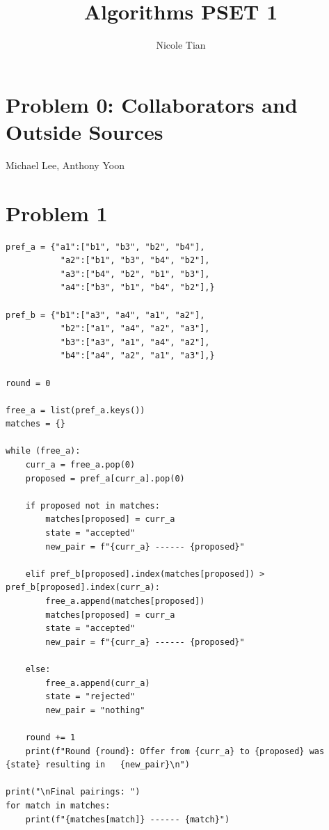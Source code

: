 \documentclass[12pt]{article}
\title{Algorithms PSET 1}
\author{Nicole Tian}
\begin{document}
\maketitle                  %

\section*{Problem 0: Collaborators and Outside Sources}
Michael Lee, Anthony Yoon


\section*{Problem 1}
\begin{algorithm}[H]
\caption{Gale--Shapley (A-proposing) -- Python implementation}
\begin{lstlisting}
pref_a = {"a1":["b1", "b3", "b2", "b4"],
           "a2":["b1", "b3", "b4", "b2"],
           "a3":["b4", "b2", "b1", "b3"],
           "a4":["b3", "b1", "b4", "b2"],}

pref_b = {"b1":["a3", "a4", "a1", "a2"],
           "b2":["a1", "a4", "a2", "a3"],
           "b3":["a3", "a1", "a4", "a2"],
           "b4":["a4", "a2", "a1", "a3"],}

round = 0

free_a = list(pref_a.keys())
matches = {}

while (free_a):
    curr_a = free_a.pop(0)
    proposed = pref_a[curr_a].pop(0)

    if proposed not in matches:
        matches[proposed] = curr_a
        state = "accepted"
        new_pair = f"{curr_a} ------ {proposed}"

    elif pref_b[proposed].index(matches[proposed]) > pref_b[proposed].index(curr_a):
        free_a.append(matches[proposed])
        matches[proposed] = curr_a
        state = "accepted"
        new_pair = f"{curr_a} ------ {proposed}"

    else:
        free_a.append(curr_a)
        state = "rejected"
        new_pair = "nothing"
    
    round += 1
    print(f"Round {round}: Offer from {curr_a} to {proposed} was {state} resulting in   {new_pair}\n")

print("\nFinal pairings: ")
for match in matches:
    print(f"{matches[match]} ------ {match}")
\end{lstlisting}
\end{algorithm}
\end{document}

